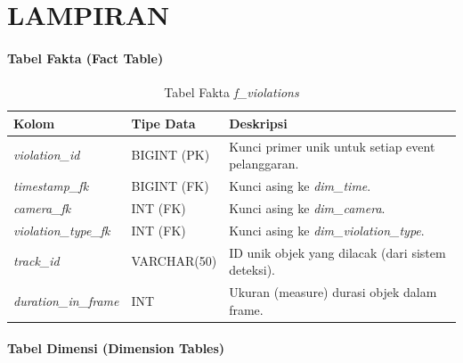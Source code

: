 
\chapter{LAMPIRAN}

\label{app:star_schema}

\subsubsection{Tabel Fakta (Fact Table)}


\begin{table}[H]
\centering
\caption{Tabel Fakta \textit{f\_violations}}
\label{tab:fact_violations}
\small\setlength{\tabcolsep}{4pt}\begin{tabularx}{\textwidth}{>{\raggedright\arraybackslash}p{}>{\raggedright\arraybackslash}p{}>{\raggedright\arraybackslash}X}
\toprule
\textbf{Kolom} & \textbf{Tipe Data} & \textbf{Deskripsi} \\
\midrule
\textit{violation\_id} & BIGINT (PK) & Kunci primer unik untuk setiap event pelanggaran. \\
\textit{timestamp\_fk} & BIGINT (FK) & Kunci asing ke \textit{dim\_time}. \\
\textit{camera\_fk} & INT (FK) & Kunci asing ke \textit{dim\_camera}. \\
\textit{violation\_type\_fk} & INT (FK) & Kunci asing ke \textit{dim\_violation\_type}. \\
\textit{track\_id} & VARCHAR(50) & ID unik objek yang dilacak (dari sistem deteksi). \\
\textit{duration\_in\_frame} & INT & Ukuran (measure) durasi objek dalam frame. \\
\bottomrule
\end{tabularx}
\end{table}

\subsubsection{Tabel Dimensi (Dimension Tables)}


